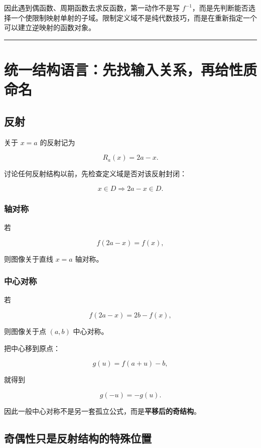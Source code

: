 \documentclass[11pt,a4paper]{ctexart}
\begin{document}
因此遇到偶函数、周期函数去求反函数，第一动作不是写
\(f^{-1}\)，而是先判断能否选择一个使限制映射单射的子域。限制定义域不是纯代数技巧，而是在重新指定一个可以建立逆映射的函数对象。

\begin{center}\rule{0.5\linewidth}{0.5pt}\end{center}

\section{统一结构语言：先找输入关系，再给性质命名}\label{ux7edfux4e00ux7ed3ux6784ux8bedux8a00ux5148ux627eux8f93ux5165ux5173ux7cfbux518dux7ed9ux6027ux8d28ux547dux540d}

\subsection{反射}\label{ux53cdux5c04}

关于 \(x=a\) 的反射记为

\[
R_a(x)=2a-x.
\]

讨论任何反射结构以前，先检查定义域是否对该反射封闭：

\[
x\in D\Longrightarrow 2a-x\in D.
\]

\subsubsection{轴对称}\label{ux8f74ux5bf9ux79f0}

若

\[
\boxed{f(2a-x)=f(x)},
\]

则图像关于直线 \(x=a\) 轴对称。

\subsubsection{中心对称}\label{ux4e2dux5fc3ux5bf9ux79f0}

若

\[
\boxed{f(2a-x)=2b-f(x)},
\]

则图像关于点 \((a,b)\) 中心对称。

把中心移到原点：

\[
g(u)=f(a+u)-b,
\]

就得到

\[
g(-u)=-g(u).
\]

因此一般中心对称不是另一套孤立公式，而是\textbf{平移后的奇结构}。

\subsection{奇偶性只是反射结构的特殊位置}\label{ux5947ux5076ux6027ux53eaux662fux53cdux5c04ux7ed3ux6784ux7684ux7279ux6b8aux4f4dux7f6e}
\end{document}
